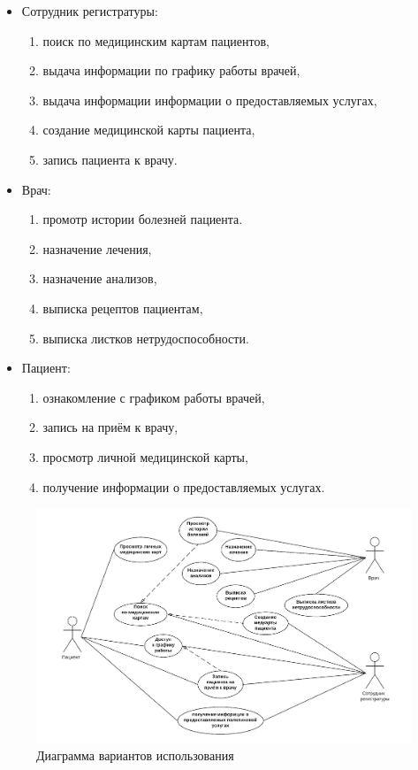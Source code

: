 \documentclass[14pt,a4paper,russian]{extreport}
\begin{document}
\begin{itemize}[noitemsep]
    \item Сотрудник регистратуры:
        \begin{enumerate}[noitemsep]
            \item поиск по медицинским картам пациентов,
            \item выдача информации по графику работы врачей,
            \item выдача информации информации о предоставляемых услугах,
            \item создание медицинской карты пациента,
            \item запись пациента к врачу.
        \end{enumerate}
    \item Врач:
        \begin{enumerate}[noitemsep]
            \item промотр истории болезней пациента.
            \item назначение лечения,
            \item назначение анализов,
            \item выписка рецептов пациентам,
            \item выписка листков нетрудоспособности.
        \end{enumerate}
    \item Пациент:
        \begin{enumerate}[noitemsep]
            \item ознакомление с графиком работы врачей,
            \item запись на приём к врачу,
            \item просмотр личной медицинской карты,
            \item получение информации о предоставляемых услугах.
        \end{enumerate}
\end{itemize}
\begin{figure}[h!]
        \includegraphics[width=\textwidth]{ClinicDB}
        \caption{Диаграмма вариантов использования}
        \label{fig:ClinicDB}
\end{figure}
\end{document}
